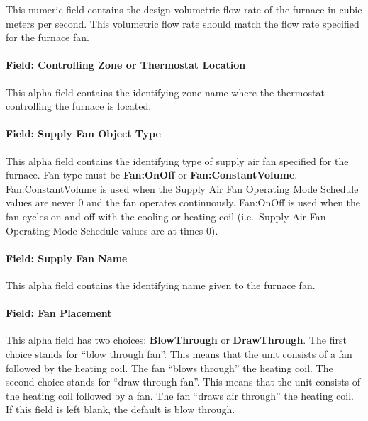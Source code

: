 This numeric field contains the design volumetric flow rate of the furnace in cubic meters per second. This volumetric flow rate should match the flow rate specified for the furnace fan.

\paragraph{Field: Controlling Zone or Thermostat Location}\label{field-controlling-zone-or-thermostat-location-5}

This alpha field contains the identifying zone name where the thermostat controlling the furnace is located.

\paragraph{Field: Supply Fan Object Type}\label{field-supply-fan-object-type-3}

This alpha field contains the identifying type of supply air fan specified for the furnace. Fan type must be \textbf{Fan:OnOff} or \textbf{Fan:ConstantVolume}. Fan:ConstantVolume is used when the Supply Air Fan Operating Mode Schedule values are never 0 and the fan operates continuously. Fan:OnOff is used when the fan cycles on and off with the cooling or heating coil (i.e.~Supply Air Fan Operating Mode Schedule values are at times 0).

\paragraph{Field: Supply Fan Name}\label{field-supply-fan-name-3}

This alpha field contains the identifying name given to the furnace fan.

\paragraph{Field: Fan Placement}\label{field-fan-placement-4}

This alpha field has two choices: \textbf{BlowThrough} or \textbf{DrawThrough}. The first choice stands for ``blow through fan''. This means that the unit consists of a fan followed by the heating coil. The fan ``blows through'' the heating coil. The second choice stands for ``draw through fan''. This means that the unit consists of the heating coil followed by a fan. The fan ``draws air through'' the heating coil. If this field is left blank, the default is blow through.

